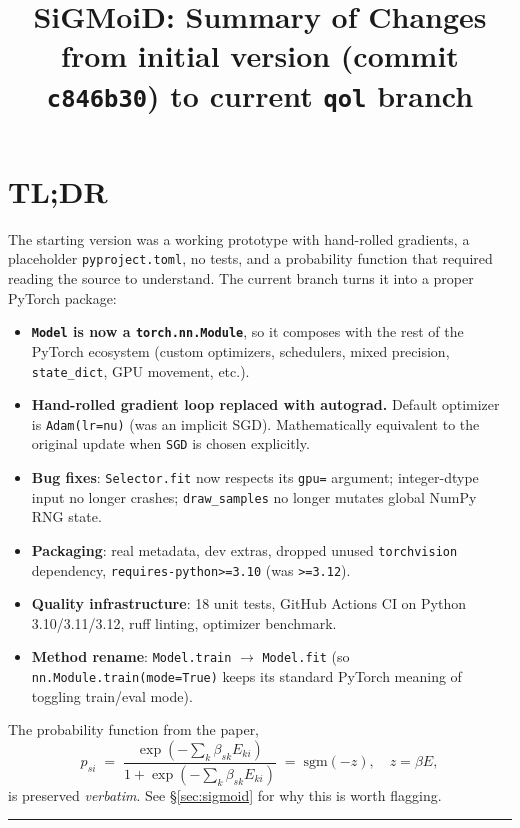 \documentclass[11pt]{article}
\title{SiGMoiD: Summary of Changes\\\large from initial version (commit \texttt{c846b30}) to current \texttt{qol} branch}
\author{}
\date{}
\begin{document}
\maketitle

\section*{TL;DR}

The starting version was a working prototype with hand-rolled gradients, a
placeholder \texttt{pyproject.toml}, no tests, and a probability function that
required reading the source to understand. The current branch turns it into a
proper PyTorch package:

\begin{itemize}[leftmargin=*, itemsep=2pt]
  \item \textbf{\texttt{Model} is now a \texttt{torch.nn.Module}}, so it composes with the rest of the PyTorch ecosystem (custom optimizers, schedulers, mixed precision, \texttt{state\_dict}, GPU movement, etc.).
  \item \textbf{Hand-rolled gradient loop replaced with autograd.} Default optimizer is \texttt{Adam(lr=nu)} (was an implicit SGD). Mathematically equivalent to the original update when \texttt{SGD} is chosen explicitly.
  \item \textbf{Bug fixes}: \texttt{Selector.fit} now respects its \texttt{gpu=} argument; integer-dtype input no longer crashes; \texttt{draw\_samples} no longer mutates global NumPy RNG state.
  \item \textbf{Packaging}: real metadata, dev extras, dropped unused \texttt{torchvision} dependency, \texttt{requires-python>=3.10} (was \texttt{>=3.12}).
  \item \textbf{Quality infrastructure}: 18 unit tests, GitHub Actions CI on Python 3.10/3.11/3.12, ruff linting, optimizer benchmark.
  \item \textbf{Method rename}: \texttt{Model.train} $\rightarrow$ \texttt{Model.fit} (so \texttt{nn.Module.train(mode=True)} keeps its standard PyTorch meaning of toggling train/eval mode).
\end{itemize}

\noindent The probability function from the paper,
\[
  p_{si} \;=\; \frac{\exp(-\sum_k \beta_{sk} E_{ki})}{1 + \exp(-\sum_k \beta_{sk} E_{ki})} \;=\; \mathrm{sgm}(-z), \quad z = \beta E,
\]
is preserved \emph{verbatim}. See \S\ref{sec:sigmoid} for why this is worth flagging.

\bigskip
\hrule
\bigskip
\end{document}

